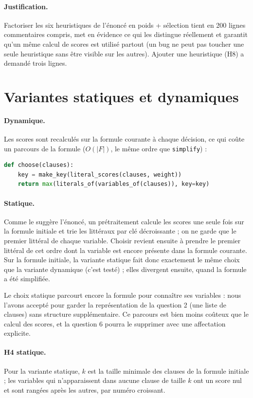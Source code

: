 \documentclass[11pt,a4paper]{article}
\begin{document}
\paragraph{Justification.} Factoriser les six heuristiques de l'énoncé en
\og poids + sélection \fg{} tient en 200 lignes commentaires compris, met en
évidence ce qui les distingue réellement et garantit qu'un même calcul de
scores est utilisé partout (un bug ne peut pas toucher une seule heuristique
sans être visible sur les autres). Ajouter une heuristique (H8) a demandé
trois lignes.

\section{Variantes statiques et dynamiques}

\paragraph{Dynamique.} Les scores sont recalculés sur la formule courante à
chaque décision, ce qui coûte un parcours de la formule ($O(|F|)$, le même
ordre que \texttt{simplify}) :
\begin{lstlisting}[language=Python]
def choose(clauses):
    key = make_key(literal_scores(clauses, weight))
    return max(literals_of(variables_of(clauses)), key=key)
\end{lstlisting}

\paragraph{Statique.} Comme le suggère l'énoncé, un prétraitement calcule
les scores une seule fois sur la formule initiale et trie les littéraux par
clé décroissante ; on ne garde que le premier littéral de chaque variable.
Choisir revient ensuite à prendre le premier littéral de cet ordre dont la
variable est encore présente dans la formule courante. Sur la formule
initiale, la variante statique fait donc exactement le même choix que la
variante dynamique (c'est testé) ; elles divergent ensuite, quand la formule
a été simplifiée.

Le choix statique parcourt encore la formule pour connaître ses variables :
nous l'avons accepté pour garder la représentation de la question 2 (une
liste de clauses) sans structure supplémentaire. Ce parcours est bien moins
coûteux que le calcul des scores, et la question 6 pourra le supprimer avec
une affectation explicite.

\paragraph{H4 statique.} Pour la variante statique, $k$ est la taille
minimale des clauses de la formule initiale ; les variables qui n'apparaissent
dans aucune clause de taille $k$ ont un score nul et sont rangées après les
autres, par numéro croissant.
\end{document}
